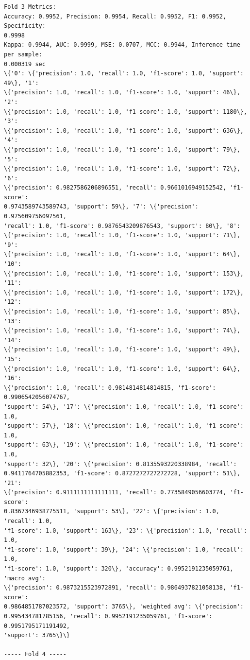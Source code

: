 \documentclass[11pt]{article}
\begin{document}
    \begin{Verbatim}[commandchars=\\\{\}]
Fold 3 Metrics:
Accuracy: 0.9952, Precision: 0.9954, Recall: 0.9952, F1: 0.9952, Specificity:
0.9998
Kappa: 0.9944, AUC: 0.9999, MSE: 0.0707, MCC: 0.9944, Inference time per sample:
0.000319 sec
\{'0': \{'precision': 1.0, 'recall': 1.0, 'f1-score': 1.0, 'support': 49\}, '1':
\{'precision': 1.0, 'recall': 1.0, 'f1-score': 1.0, 'support': 46\}, '2':
\{'precision': 1.0, 'recall': 1.0, 'f1-score': 1.0, 'support': 1180\}, '3':
\{'precision': 1.0, 'recall': 1.0, 'f1-score': 1.0, 'support': 636\}, '4':
\{'precision': 1.0, 'recall': 1.0, 'f1-score': 1.0, 'support': 79\}, '5':
\{'precision': 1.0, 'recall': 1.0, 'f1-score': 1.0, 'support': 72\}, '6':
\{'precision': 0.9827586206896551, 'recall': 0.9661016949152542, 'f1-score':
0.9743589743589743, 'support': 59\}, '7': \{'precision': 0.975609756097561,
'recall': 1.0, 'f1-score': 0.9876543209876543, 'support': 80\}, '8':
\{'precision': 1.0, 'recall': 1.0, 'f1-score': 1.0, 'support': 71\}, '9':
\{'precision': 1.0, 'recall': 1.0, 'f1-score': 1.0, 'support': 64\}, '10':
\{'precision': 1.0, 'recall': 1.0, 'f1-score': 1.0, 'support': 153\}, '11':
\{'precision': 1.0, 'recall': 1.0, 'f1-score': 1.0, 'support': 172\}, '12':
\{'precision': 1.0, 'recall': 1.0, 'f1-score': 1.0, 'support': 85\}, '13':
\{'precision': 1.0, 'recall': 1.0, 'f1-score': 1.0, 'support': 74\}, '14':
\{'precision': 1.0, 'recall': 1.0, 'f1-score': 1.0, 'support': 49\}, '15':
\{'precision': 1.0, 'recall': 1.0, 'f1-score': 1.0, 'support': 64\}, '16':
\{'precision': 1.0, 'recall': 0.9814814814814815, 'f1-score': 0.9906542056074767,
'support': 54\}, '17': \{'precision': 1.0, 'recall': 1.0, 'f1-score': 1.0,
'support': 57\}, '18': \{'precision': 1.0, 'recall': 1.0, 'f1-score': 1.0,
'support': 63\}, '19': \{'precision': 1.0, 'recall': 1.0, 'f1-score': 1.0,
'support': 32\}, '20': \{'precision': 0.8135593220338984, 'recall':
0.9411764705882353, 'f1-score': 0.8727272727272728, 'support': 51\}, '21':
\{'precision': 0.9111111111111111, 'recall': 0.7735849056603774, 'f1-score':
0.8367346938775511, 'support': 53\}, '22': \{'precision': 1.0, 'recall': 1.0,
'f1-score': 1.0, 'support': 163\}, '23': \{'precision': 1.0, 'recall': 1.0,
'f1-score': 1.0, 'support': 39\}, '24': \{'precision': 1.0, 'recall': 1.0,
'f1-score': 1.0, 'support': 320\}, 'accuracy': 0.9952191235059761, 'macro avg':
\{'precision': 0.9873215523972891, 'recall': 0.9864937821058138, 'f1-score':
0.9864851787023572, 'support': 3765\}, 'weighted avg': \{'precision':
0.995434781785156, 'recall': 0.9952191235059761, 'f1-score': 0.9951795171191492,
'support': 3765\}\}

----- Fold 4 -----

    \end{Verbatim}
\end{document}
